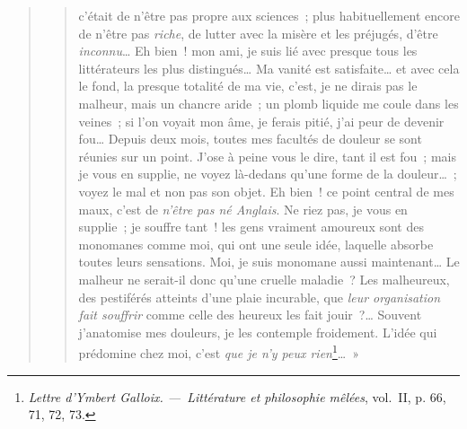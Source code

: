 \documentclass[french,twoside]{book} %
\begin{document}
\begin{verse}
\begin{verse}
c’était de n’être pas propre aux sciences ; plus habituellement encore de n’être pas \emph{riche}, de lutter avec la misère et les préjugés, d’être \emph{inconnu}… Eh bien ! mon ami, je suis lié avec presque tous les littérateurs les plus distingués… Ma vanité est satisfaite… et avec cela le fond, la presque totalité de ma vie, c’est, je ne dirais pas le malheur, mais un chancre aride ; un plomb liquide me coule dans les veines ; si l’on voyait mon âme, je ferais pitié, j’ai peur de devenir fou… Depuis deux mois, toutes mes facultés de douleur se sont réunies sur un point. J’ose à peine vous le dire, tant il est fou ; mais je vous en supplie, ne voyez là-dedans qu’une forme de la douleur… ; voyez le mal et non pas son objet. Eh bien ! ce point central de mes maux, c’est de \emph{n’être pas né Anglais}. Ne riez pas, je vous en supplie ; je souffre tant ! les gens vraiment amoureux sont des monomanes comme moi, qui ont une seule idée, laquelle absorbe toutes leurs sensations. Moi, je suis monomane aussi maintenant… Le malheur ne serait-il donc qu’une cruelle maladie ? Les malheureux, des pestiférés atteints d’une plaie incurable, que \emph{leur organisation fait souffrir} comme celle des heureux les fait jouir ?… Souvent j’anatomise mes douleurs, je les contemple froidement. L’idée qui prédomine chez moi, c’est \emph{que je n’y peux rien}\footnote{\emph{Lettre d’Ymbert Galloix. — Littérature et philosophie mêlées}, vol. II, p. 66, 71, 72, 73.}… »\par

\end{verse}
\end{verse}
\end{document}
